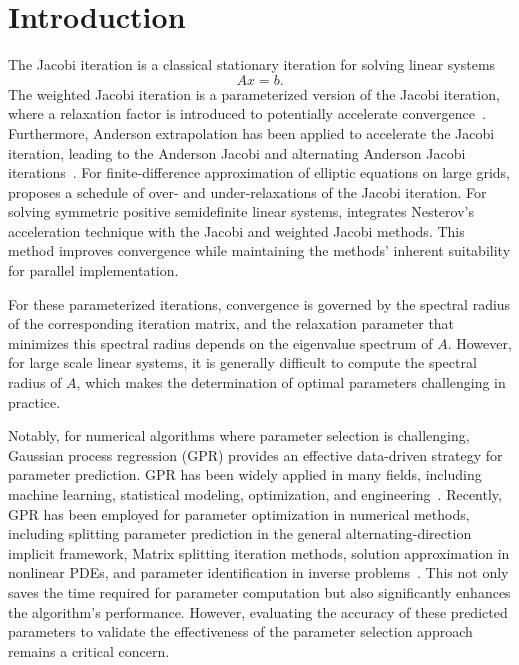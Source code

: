 \documentclass[preprint,review,sort&compress,3p]{elsarticle}
\begin{document}


\section{Introduction} \label{sec:1}

{  

The Jacobi iteration is a classical stationary iteration for solving linear systems 
$$Ax=b.$$ 
The weighted Jacobi iteration is a parameterized version of the Jacobi iteration, where a relaxation factor is introduced to potentially accelerate convergence~\cite{Y-2003}.
Furthermore, Anderson extrapolation has been applied to accelerate the Jacobi iteration, leading to the Anderson Jacobi and alternating Anderson Jacobi iterations~\cite{P-P-J-2016}. 
For finite-difference approximation of elliptic equations on large grids, \cite{X-R-2014} proposes a schedule of over- and under-relaxations of the Jacobi iteration. For solving symmetric positive semidefinite linear systems, \cite{L-Q-K-H-2025} integrates Nesterov's acceleration technique with the Jacobi and weighted Jacobi methods. This method improves convergence while maintaining the methods' inherent suitability for parallel implementation.


For these parameterized iterations, convergence is governed by the spectral radius of the corresponding iteration matrix, and the relaxation parameter that minimizes this spectral radius depends on the eigenvalue spectrum of $A$. 
However, for large scale linear systems, it is generally difficult to compute the spectral radius of $A$, which makes the determination of optimal parameters challenging in practice.
}

Notably, for numerical algorithms where parameter selection is challenging, Gaussian process  regression (GPR) provides an effective data-driven strategy for parameter prediction. GPR has been widely applied in many fields, including machine learning, statistical modeling, optimization, and engineering~\cite{C-C-2006, R-M-L-A-D-2014, W-P-W-2011, M-D-C-2013}. Recently, GPR has been employed for parameter optimization in numerical methods, including splitting parameter prediction in the general alternating-direction implicit framework,  Matrix splitting iteration methods, solution approximation in nonlinear PDEs, and parameter identification in inverse problems~\cite{F-D-S-M-2013,J-S-Z-2022, K-J-Q-2023, Y-B-H-A-2021}. This not only saves the time required for parameter computation but also significantly enhances the algorithm's performance. However, evaluating the accuracy of these predicted parameters to validate the effectiveness of the parameter selection approach remains a critical concern.
\end{document}
